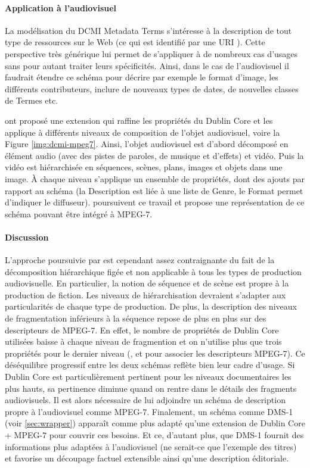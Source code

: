 \paragraph{Application à l'audiovisuel}
La modélisation du DCMI Metadata Terms s'intéresse à la description de tout type de ressources sur le Web (ce qui est identifié par une URI \cite{Berners-Lee1998}).
Cette perspective très générique lui permet de s'appliquer à de nombreux cas d'usages sans pour autant traiter leurs spécificités. 
Ainsi, dans le cas de l'audiovisuel il faudrait étendre ce schéma pour décrire par exemple le format d'image, les différents contributeurs, inclure de nouveaux types de dates, de nouvelles classes de Termes etc.

\cite{Hunter1998} ont proposé une extension qui raffine les propriétés du Dublin Core et les applique à différents niveaux de composition de l'objet audiovisuel, voire la Figure \ref{img:dcmi-mpeg7}.
Ainsi, l'objet audiovisuel est d'abord décomposé en élément audio (avec des pistes de paroles, de musique et d'effets) et vidéo.
Puis la vidéo est hiérarchisée en séquences, scènes, plans, images et objets dans une image.
À chaque niveau s'applique un ensemble de propriétés, dont des ajouts par rapport au schéma (la Description est liée à une liste de Genre, le Format permet d'indiquer le diffuseur).
\cite{Hunter1999} poursuivent ce travail et propose une représentation de ce schéma pouvant être intégré à MPEG-7. 


\paragraph{Discussion}
L'approche poursuivie par \citeauthor{Hunter1999} est cependant assez contraignante du fait de la décomposition hiérarchique figée et non applicable à tous les types de production audiovisuelle.
En particulier, la notion de séquence et de scène est propre à la production de fiction. 
Les niveaux de hiérarchisation devraient s'adapter aux particularités de chaque type de production. 
De plus, la description des niveaux de fragmentation inférieurs à la séquence repose de plus en plus sur des descripteurs de MPEG-7. 
En effet, le nombre de propriétés de Dublin Core utilisées baisse à chaque niveau de fragmention et on n'utilise plus que trois propriétés pour le dernier niveau (,  et  pour associer les descripteurs MPEG-7).
Ce déséquilibre progressif entre les deux schémas reflète bien leur cadre d'usage. 
Si Dublin Core est particulièrement pertinent pour les niveaux documentaires les plus hauts, sa pertinence diminue quand on rentre dans le détails des fragments audiovisuels.
Il est alors nécessaire de lui adjoindre un schéma de description propre à l'audiovisuel comme MPEG-7.
Finalement, un schéma comme DMS-1 (voir \ref{sec:wrapper}) apparaît comme plus adapté qu'une extension de Dublin Core + MPEG-7 pour couvrir ces besoins.
Et ce, d'autant plus, que DMS-1 fournit des informations plus adaptées à l'audiovisuel (ne serait-ce que l'exemple des titres) et favorise un découpage factuel extensible ainsi qu'une description éditoriale.



